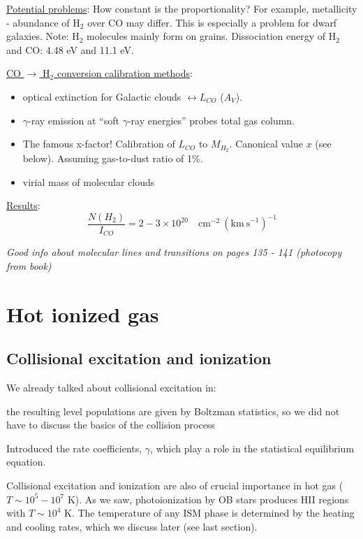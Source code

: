 \documentclass[11pt]{article}
\newcommand{\mar}[1]{\hspace{0pt}\marginpar{-\textcolor{black}{#1}-}}
\newcommand{\mynotes}[1]{{\fontfamily{cmss}\selectfont \textit{#1}}}
\let\oldsection\section
\renewcommand\section{\clearpage\oldsection}
\begin{document}
\underline{Potential problems}:
How constant is the proportionality? For example, metallicity -
abundance of H$_{2}$ over CO may differ. This is especially a problem
for dwarf galaxies. Note: H$_{2}$ molecules mainly form on grains.
Dissociation energy of H$_{2}$ and CO: 4.48 eV and 11.1 eV.

\underline{CO $\rightarrow$ H$_{2}$ conversion calibration methods}:
\begin{itemize}
    \item optical extinction for Galactic clouds $\leftrightarrow L_{CO}$
        ($A_{V}$).
    \item $\gamma$-ray emission at ``soft $\gamma$-ray energies'' probes
        total gas column.
    \item The famous x-factor! Calibration of $L_{CO}$ to $M_{H_{2}}$.
        Canonical value $x$ (see below).
        Assuming gas-to-dust ratio of 1\%.
    \item virial mass of molecular clouds
\end{itemize}

\underline{Results}:
\[
    \frac{N(H_{2})}{I_{CO}} = 2\!-\!3 \times 10^{20}\quad
    \mathrm{cm}^{-2}\
    (\mathrm{km\ s}^{-1})^{-1}
    \]

\mynotes{Good info about molecular lines and transitions on pages
135 - 141 (photocopy from book)}

\newpage
\section{Hot ionized gas}
\subsection{Collisional excitation and ionization}
\mar{142}We already talked about collisional excitation in:
\begin{description}[labelwidth=5em, leftmargin=8em]
    \item [HI] the resulting level populations are given by Boltzman
        statistics, so we did not have to discuss the basics of the
        collision process
    \item [HII regions] Introduced the rate coefficients, $\gamma$,
        which play a role in the statistical equilibrium equation.
\end{description}
Collisional excitation and ionization are also of crucial importance in hot
gas ($T \sim 10^{5} - 10^{7}$ K). As we saw, photoionization by OB stars
produces HII regions with $T \sim 10^{4}$ K. The temperature of any ISM
phase is determined by the heating and cooling rates, which we discuss
later (see last section).
\end{document}
